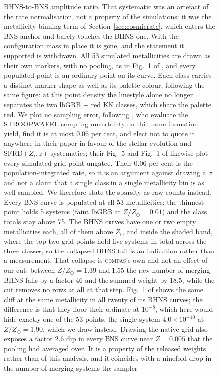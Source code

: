 \documentclass[twocolumn,apj]{openjournal}
\newcommand{\compas}{\textsc{compas}}
\begin{document}
\begin{figure}[!tbp]
{BHNS-to-BNS amplitude ratio. That systematic was an artefact of the rate
normalisation, not a property of the simulations: it was the metallicity-binning
term of Section~\ref{sec:cosmicrate}, which enters the BNS anchor and barely
touches the BHNS one. With the configuration mass in place it is gone, and the
statement it supported is withdrawn.
All 53 simulated metallicities are drawn as their own markers, with no
pooling, as in Fig.~1 of \citet{broekgaarden2022}, and every populated point
is an ordinary point on its curve. Each class carries a distinct marker shape
as well as its palette colour, following the same figure: at this point density
the linestyle alone no longer separates the two lbGRB $+$ red KN classes, which
share the palette red. We
plot no sampling error, following \citet[][their Sec.~2.7]{broekgaarden2021},
who evaluate the STROOPWAFEL sampling uncertainty on this same formation
yield, find it is at most 0.06 per cent, and elect not to quote it anywhere
in their paper in favour of the stellar-evolution and $\mathrm{SFRD}(Z_i,z)$
systematics; their Fig.~5 and Fig.~1 of \citet{broekgaarden2022} likewise
plot every simulated grid point ungated. Their 0.06 per cent is the
population-integrated rate, so it is an argument against drawing a $\sigma$
and not a claim that a single class in a single metallicity bin is as well
sampled. We therefore state the sparsity as raw counts instead. Every BNS
curve is populated at all 53 metallicities; the thinnest point holds 5 systems
(faint lbGRB at $Z/Z_\odot=0.01$) and the class totals stay above 75. The BHNS
curves have one or two empty metallicities each, all of them above $Z_\odot$
and inside the shaded band, where the top two grid points hold five systems in
total across the three classes, so the collapsed BHNS tail is an indication
rather than a measurement. That collapse is \compas's own and not an effect
of our cut: between $Z/Z_\odot=1.39$ and 1.55 the raw number of merging BHNS
falls by a factor 46 and the summed weight by 18.5, while the cut removes no
rows at all at that step. Fig.~1 of \citet{broekgaarden2022} shows the same
cliff at the same metallicity in all twenty of its BHNS curves; the
difference is that they floor their ordinate at $10^{-8}$, which here would
hide exactly one of the 53 points, the single-system
$4.0\times10^{-10}$ at $Z/Z_\odot=1.90$, which we draw instead.
Drawing the native grid also exposes a factor 2.6
dip in every BNS curve near $Z=0.005$ that the pooling had averaged over. It
is a property of the released weights rather than of this analysis, and it
coincides with a ninefold drop in the number of merging systems the sampler
}
\end{figure}
\end{document}
